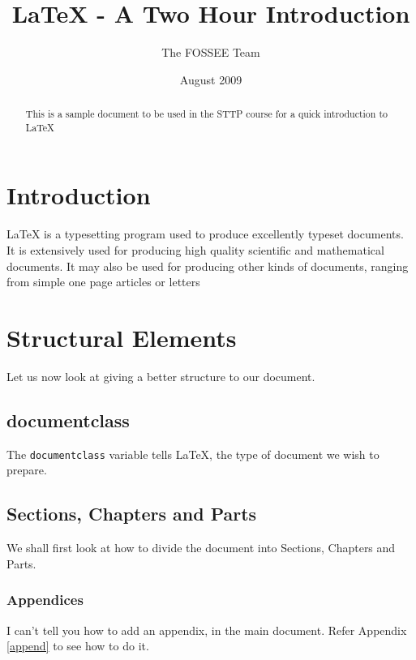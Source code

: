 \documentclass[11pt,a4paper,twoside]{article}
\title{LaTeX - A Two Hour Introduction}
\author{The FOSSEE Team}
\date{August 2009}
\begin{document}
\maketitle
\tableofcontents
\listoftables
\listoffigures
\begin{abstract}
This is a sample document to be used in the STTP course for a quick introduction to \LaTeX
\end{abstract}
\section{Introduction}
LaTeX is a typesetting program used to produce excellently typeset documents. It is extensively used for producing high quality scientific and mathematical documents. It may also be used for producing other kinds of documents, ranging from simple one page articles or letters 
\section{Structural Elements}
Let us now look at giving a better structure to our document. 
\subsection{documentclass}
The \verb+documentclass+ variable tells \LaTeX, the type of document we wish to prepare. 

\subsection{Sections, Chapters and Parts}
We shall first look at how to divide the document into Sections, Chapters and Parts. 

\subsubsection{Appendices}
I can't tell you how to add an appendix, in the main document. Refer Appendix \ref{append} to see how to do it. 
\end{document}
